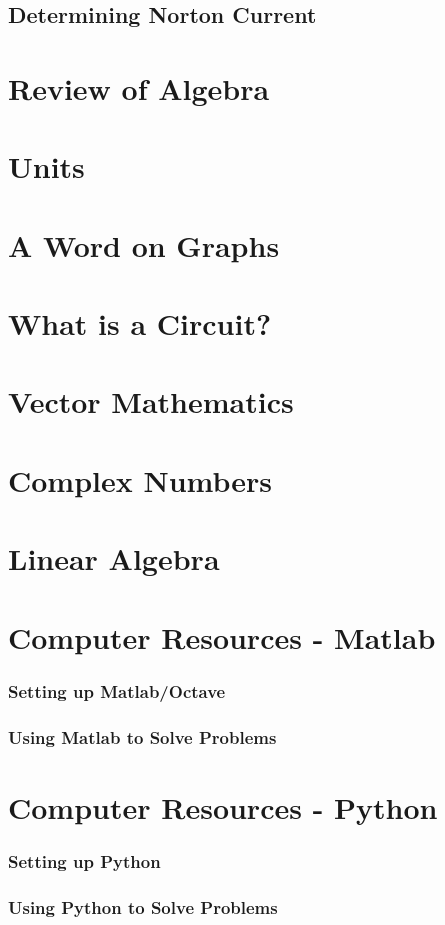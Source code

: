 \documentclass[a4paper,11pt]{book}
\begin{document}
\section{Determining Norton Current}


\appendix
\chapter{Review of Algebra}


\chapter{Units} \label{sec:PrelimUnits}

\chapter{A Word on Graphs}


\chapter{What is a Circuit?}


\chapter{Vector Mathematics}


\chapter{Complex Numbers}


\chapter{Linear Algebra}


\chapter{Computer Resources - Matlab}
\subsection*{Setting up Matlab/Octave}
\subsection*{Using Matlab to Solve Problems}
\chapter{Computer Resources - Python}
\subsection*{Setting up Python}
\subsection*{Using Python to Solve Problems}
\end{document}
